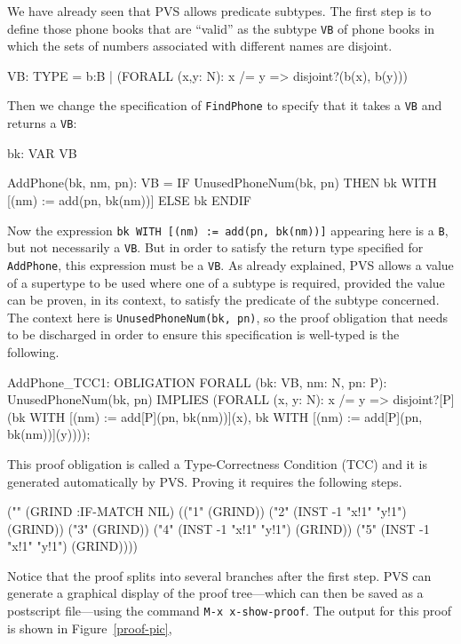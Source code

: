 We have already seen that PVS allows predicate subtypes.  The first
step is to define those phone books that are ``valid'' as the subtype {\tt VB}
of phone books in which the sets of numbers associated with different
names are disjoint.
\begin{pvsexample}
VB: TYPE = { b:B | (FORALL (x,y: N): x /= y => disjoint?(b(x), b(y))) }
\end{pvsexample}
Then we change the specification of {\tt FindPhone} to specify that it takes
a {\tt VB} and returns a {\tt VB}:
\begin{pvsexample}
bk: VAR VB

AddPhone(bk, nm, pn): VB = 
  IF UnusedPhoneNum(bk, pn) THEN bk WITH [(nm) := add(pn, bk(nm))]
    ELSE bk
  ENDIF
\end{pvsexample}
Now the expression {\tt bk WITH [(nm) := add(pn, bk(nm))]} appearing
here is a {\tt B}, but not necessarily a {\tt VB}.  But in order to
satisfy the return type specified for {\tt AddPhone}, this expression
must be a {\tt VB}\@.  As already explained, PVS allows a value of a
supertype to be used where one of a subtype is required, provided the
value can be proven, in its context, to satisfy the predicate of the
subtype concerned.  The context here is {\tt UnusedPhoneNum(bk, pn)},
so the proof obligation that needs to be discharged in order to ensure
this specification is well-typed is the following.
\begin{pvsexample}
AddPhone_TCC1: OBLIGATION
  FORALL (bk: VB, nm: N, pn: P):
    UnusedPhoneNum(bk, pn) IMPLIES
     (FORALL (x, y: N):
        x /= y =>
         disjoint?[P](bk WITH [(nm) := add[P](pn, bk(nm))](x),
                      bk WITH [(nm) := add[P](pn, bk(nm))](y))));
\end{pvsexample}
This proof obligation is called a Type-Correctness Condition (TCC) and
it is generated automatically by PVS\@.  
Proving it requires the following steps.
\begin{pvsexample}
("" (GRIND :IF-MATCH NIL)
    (("1" (GRIND)) ("2" (INST -1 "x!1" "y!1")
                        (GRIND))
                   ("3" (GRIND))
                   ("4" (INST -1 "x!1" "y!1")
                        (GRIND))
                   ("5" (INST -1 "x!1" "y!1")
                        (GRIND))))
\end{pvsexample}
Notice that the proof splits into several branches after the first
step.  PVS can generate a graphical display of the proof tree---which
can then be saved as a postscript file---using the command {\tt M-x
x-show-proof}.  The output for this proof is shown in
Figure~\ref{proof-pic},

